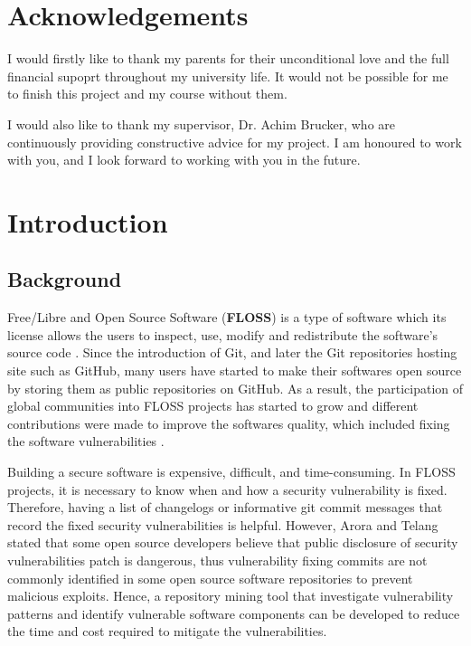 \documentclass[12pt, a4paper]{report}
\begin{document}
\newpage


\chapter*{Acknowledgements}
I would firstly like to thank my parents for their unconditional love and the full financial supoprt
throughout my university life. It would not be possible for me to finish this project and my course
without them.

I would also like to thank my supervisor, Dr. Achim Brucker, who are continuously providing
constructive advice for my project. I am honoured to work with you, and I look forward to working
with you in the future.

\newpage

\tableofcontents


\listoftables {}

\newpage


\chapter{Introduction}
\section{Background}
Free/Libre and Open Source Software (\textbf{FLOSS}) is a type of software which its license allows
the users to inspect, use, modify and redistribute the software's source code \cite{crowston_2012}.
Since the introduction of Git, and later the Git repositories hosting site such as GitHub, many
users have started to make their softwares open source by storing them as public repositories on
GitHub. As a result, the participation of global communities into FLOSS projects has started to grow
and different contributions were made to improve the softwares quality, which included fixing the
software vulnerabilities \cite{dabbish_2012}.

Building a secure software is expensive, difficult, and time-consuming. In FLOSS projects, it is
necessary to know when and how a security vulnerability is fixed. Therefore, having a list of
changelogs or informative git commit messages that record the fixed security vulnerabilities is
helpful. However, Arora and Telang \cite{arora_2005} stated that some open source developers believe
that public disclosure of security vulnerabilities patch is dangerous, thus vulnerability fixing
commits are not commonly identified in some open source software repositories to prevent malicious
exploits. Hence, a repository mining tool that investigate vulnerability patterns and identify
vulnerable software components can be developed to reduce the time and cost required to mitigate the
vulnerabilities.
\end{document}
